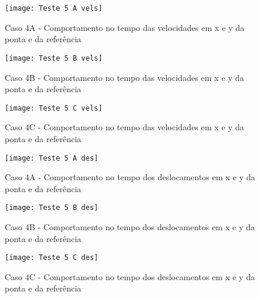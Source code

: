 \begin{figure}[H]
    \begin{center}
    \caption{Caso 4A - Comportamento no tempo das velocidades em x e y da ponta e da referência}
    \texttt{[image: Teste 5 A vels]}
    \label{fig:t_5a_vels}
    \end{center}
\end{figure}

\begin{figure}[H]
    \begin{center}
    \caption{Caso 4B - Comportamento no tempo das velocidades em x e y da ponta e da referência}
    \texttt{[image: Teste 5 B vels]}
    \label{fig:t_5b_vels}
    \end{center}
\end{figure}

\begin{figure}[H]
    \begin{center}
    \caption{Caso 4C - Comportamento no tempo das velocidades em x e y da ponta e da referência}
    \texttt{[image: Teste 5 C vels]}
    \label{fig:t_5c_vels}
    \end{center}
\end{figure}

\begin{figure}[H]
    \begin{center}
    \caption{Caso 4A - Comportamento no tempo dos deslocamentos em x e y da ponta e da referência}
    \texttt{[image: Teste 5 A des]}
    \label{fig:t_5a_des}
    \end{center}
\end{figure}

\begin{figure}[H]
    \begin{center}
    \caption{Caso 4B - Comportamento no tempo dos deslocamentos em x e y da ponta e da referência}
    \texttt{[image: Teste 5 B des]}
    \label{fig:t_5b_des}
    \end{center}
\end{figure}

\begin{figure}[H]
    \begin{center}
    \caption{Caso 4C - Comportamento no tempo dos deslocamentos em x e y da ponta e da referência}
    \texttt{[image: Teste 5 C des]}
    \label{fig:t_5c_des}
    \end{center}
\end{figure}

